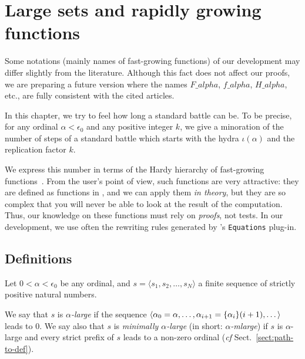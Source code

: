  
\chapter{Large sets and rapidly growing functions}\label{chap:alpha-large}

\begin{remark}
Some notations (mainly names of fast-growing functions) of our development may differ slightly from the literature. Although this fact does not affect our proofs, we are preparing a future version where the names $F\_alpha$, $f\_alpha$, $H\_alpha$, etc., are fully consistent with the cited articles.

\end{remark}

In this chapter, we try to feel how long a standard battle can be.
To be precise, for any ordinal $\alpha<\epsilon_0$ and any positive integer $k$,
we give a minoration of the number of steps of a standard battle which
starts with the hydra $\iota(\alpha)$ and the replication factor $k$.

We express this number in terms of the Hardy hierarchy of fast-growing 
functions~\cite{BW85, Wainer1970, KS81, Promel2013}.
 From the \coq{} user's point of view, such  functions are  very 
attractive:  they are defined as functions  in \gallina{}, and we can apply them \emph{in theory}, but they are so complex that you will never be able to look at the result of the computation.
 Thus, our knowledge on these functions must rely on \emph{proofs}, not tests. In our development, we use often the rewriting rules generated by \coq's \texttt{Equations} plug-in.


\section{Definitions}


\begin{definition}
Let $0<\alpha<\epsilon_0$ be any ordinal, and $s=\langle s_1, s_2, \dots, s_N\rangle$ a finite sequence of strictly positive natural numbers. 

We say that $s$ is \emph{$\alpha$-large} if the sequence $\langle \alpha_0=\alpha,\dots,\alpha_{i+1}=\mbox{$\{\alpha_i\}(i+1)$},\dots \rangle$ leads to $0$. 
We say also that $s$ is \emph{minimally $\alpha$-large} (in short:
\emph{$\alpha$-mlarge}) if $s$ is $\alpha$-large 
 and every strict prefix of $s$ leads to a non-zero ordinal (\emph{cf} Sect.~\vref{sect:path-to-def}).


\end{definition}



